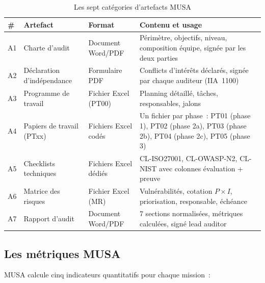 \documentclass[12pt,a4paper,oneside]{report}
\begin{document}
\begin{table}[H]
\centering\small
\caption{Les sept cat\'egories d'artefacts MUSA}
\label{tab:artefacts}
\begin{tabularx}{\textwidth}{p{0.5cm}p{3.5cm}p{4cm}X}
\toprule
\rowcolor{theadcolor}
\color{white}\textbf{\#} &
\color{white}\textbf{Artefact} &
\color{white}\textbf{Format} &
\color{white}\textbf{Contenu et usage} \\
\midrule
A1 & Charte d'audit & Document Word/PDF &
  P\'erim\`etre, objectifs, niveau, composition \'equipe, sign\'ee par les deux parties \\
A2 & D\'eclaration d'ind\'ependance & Formulaire PDF &
  Conflicts d'int\'er\^ets d\'eclar\'es, sign\'ee par chaque auditeur (IIA~1100) \\
A3 & Programme de travail & Fichier Excel (PT00) &
  Planning d\'etaill\'e, t\^aches, responsables, jalons \\
A4 & Papiers de travail (PTxx) & Fichiers Excel cod\'es &
  Un fichier par phase~: PT01 (phase 1), PT02 (phase 2a), PT03 (phase 2b), PT04 (phase 2c), PT05 (phase 3) \\
A5 & Checklists techniques & Fichiers Excel d\'edi\'es &
  CL-ISO27001, CL-OWASP-N2, CL-NIST avec colonnes \'evaluation + preuve \\
A6 & Matrice des risques & Fichier Excel (MR) &
  Vuln\'erabilit\'es, cotation $P \times I$, priorisation, responsable, \'ech\'eance \\
A7 & Rapport d'audit & Document Word/PDF &
  7 sections normalis\'ees, m\'etriques calcul\'ees, sign\'e lead auditor \\
\bottomrule
\end{tabularx}
\end{table}

\subsection{Les m\'etriques MUSA}

MUSA calcule cinq indicateurs quantitatifs pour chaque mission~:
\end{document}
